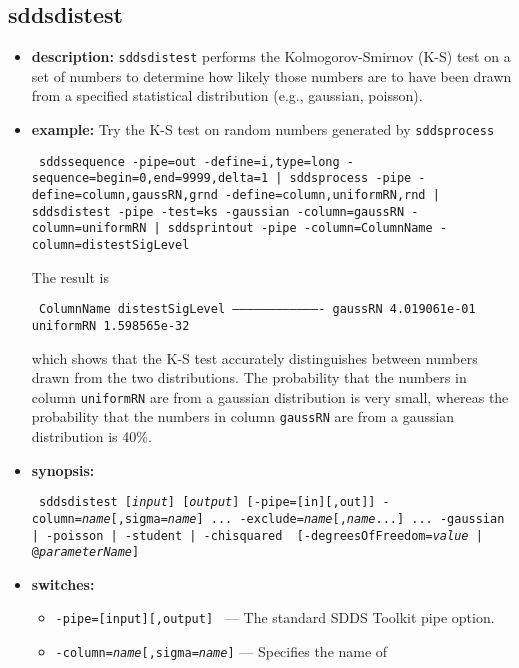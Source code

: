 \begin{latexonly}
\newpage
\end{latexonly}
\subsection{sddsdistest}
\label{sddsdistest}

\begin{itemize}
\item {\bf description:} 
{\tt sddsdistest} performs the Kolmogorov-Smirnov (K-S) test on a
set of numbers to determine how likely those numbers are to have been drawn from
a specified statistical distribution (e.g., gaussian, poisson).

\item {\bf example:}
Try the K-S test on random numbers generated by {\tt sddsprocess}
\begin{flushleft}{\tt
sddssequence -pipe=out -define=i,type=long -sequence=begin=0,end=9999,delta=1 
| sddsprocess -pipe -define=column,gaussRN,grnd -define=column,uniformRN,rnd 
| sddsdistest -pipe -test=ks -gaussian -column=gaussRN -column=uniformRN 
| sddsprintout -pipe -column=ColumnName -column=distestSigLevel
}\end{flushleft}
The result is 
\begin{flushleft}{\tt
    ColumnName      distestSigLevel 
-------------------------------------
     gaussRN         4.019061e-01 
    uniformRN        1.598565e-32 
}\end{flushleft}
which shows that the K-S test accurately distinguishes between numbers
drawn from the two distributions.  The probability that the numbers in
column {\tt uniformRN} are from a gaussian distribution is very small, whereas
the probability that the numbers in column {\tt gaussRN} are from a
gaussian distribution is 40\%.
\item {\bf synopsis:}
\begin{flushleft}{\tt
sddsdistest [{\em input}] [{\em output}] [-pipe=[in][,out]] 
-column={\em name}[,sigma={\em name}] ... -exclude={\em name}[,{\em name}...] ...
{-gaussian | -poisson | -student | -chisquared }
[-degreesOfFreedom={{\em value} | @{\em parameterName}}]
}\end{flushleft}
\item {\bf switches:}
    \begin{itemize}
    \item {\tt -pipe=[input][,output] } --- The standard SDDS Toolkit pipe option.
        \item {\tt -column={\em name}[,sigma={\em name}]} --- Specifies the name of

\end{itemize}
\end{itemize}
